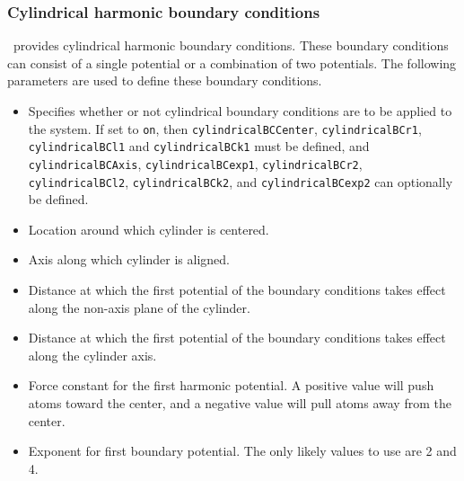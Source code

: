 \subsubsection{Cylindrical harmonic boundary conditions}

\PDAC\ provides cylindrical harmonic boundary conditions.  These 
boundary conditions can consist of a single potential or a 
combination of two potentials.
The following parameters are used to define these boundary conditions.  

\begin{itemize}

\item
{}
{Specifies whether or not cylindrical boundary conditions 
are to be applied to the system.  If 
set to {\tt on}, then {\tt cylindricalBCCenter}, {\tt cylindricalBCr1}, {\tt cylindricalBCl1} and {\tt cylindricalBCk1} 
must be defined, and {\tt cylindricalBCAxis}, {\tt cylindricalBCexp1}, {\tt cylindricalBCr2}, {\tt cylindricalBCl2},
{\tt cylindricalBCk2}, and {\tt cylindricalBCexp2} can optionally be 
defined.}

\item
{}
{Location around which cylinder is centered.}

\item
{}
{Axis along which cylinder is aligned.}

\item
{}
{Distance at which the first potential of the boundary conditions takes
effect along the non-axis plane of the cylinder.}

\item
{}
{Distance at which the first potential of the boundary conditions takes
effect along the cylinder axis.}

\item
{}
{Force constant for the first harmonic potential.  A positive
value will push atoms toward the center, and a negative
value will pull atoms away from the center.}

\item
{}
{Exponent for first boundary potential.  The only likely values to
use are 2 and 4.}


\end{itemize}
